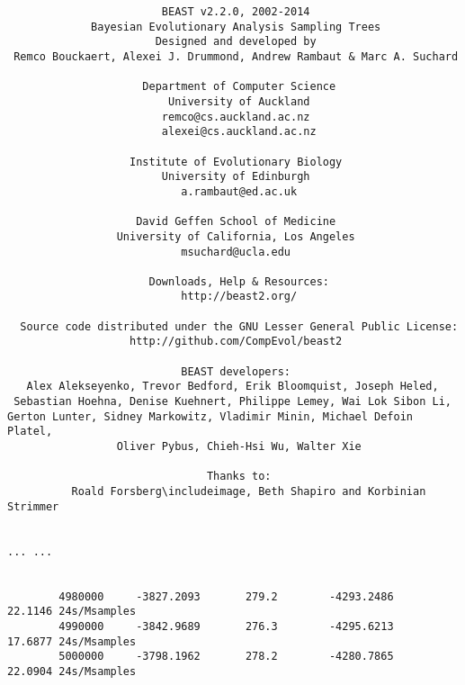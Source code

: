 \documentclass{article}
\newcommand{\includeimage}[2][]{%
\texttt{[image: \#2]}
}
\begin{document}
{\tiny   
\begin{verbatim}
                        BEAST v2.2.0, 2002-2014
             Bayesian Evolutionary Analysis Sampling Trees
                       Designed and developed by
 Remco Bouckaert, Alexei J. Drummond, Andrew Rambaut & Marc A. Suchard
                                    
                     Department of Computer Science
                         University of Auckland
                        remco@cs.auckland.ac.nz
                        alexei@cs.auckland.ac.nz
                                    
                   Institute of Evolutionary Biology
                        University of Edinburgh
                           a.rambaut@ed.ac.uk
                                    
                    David Geffen School of Medicine
                 University of California, Los Angeles
                           msuchard@ucla.edu
                                    
                      Downloads, Help & Resources:
                           http://beast2.org/
                                    
  Source code distributed under the GNU Lesser General Public License:
                   http://github.com/CompEvol/beast2
                                    
                           BEAST developers:
   Alex Alekseyenko, Trevor Bedford, Erik Bloomquist, Joseph Heled, 
 Sebastian Hoehna, Denise Kuehnert, Philippe Lemey, Wai Lok Sibon Li, 
Gerton Lunter, Sidney Markowitz, Vladimir Minin, Michael Defoin Platel, 
                 Oliver Pybus, Chieh-Hsi Wu, Walter Xie
                                    
                               Thanks to:
          Roald Forsberg\includeimage, Beth Shapiro and Korbinian Strimmer


... ...


        4980000     -3827.2093       279.2        -4293.2486        22.1146 24s/Msamples
        4990000     -3842.9689       276.3        -4295.6213        17.6877 24s/Msamples
        5000000     -3798.1962       278.2        -4280.7865        22.0904 24s/Msamples


\end{verbatim}}
\end{document}
